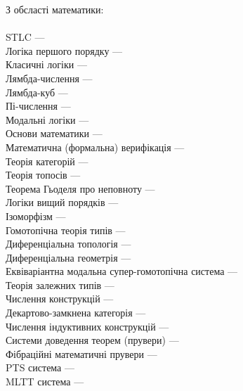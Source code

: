 \newpage
З обсласті математики:
\\
\\
STLC --- \\
Логіка першого порядку --- \\
Класичні логіки --- \\
Лямбда-числення --- \\
Лямбда-куб --- \\
Пі-числення --- \\
Модальні логіки --- \\
Основи математики --- \\
Математична (формальна) верифікація --- \\
Теорія категорій --- \\
Теорія топосів --- \\
Теорема Гьоделя про неповноту --- \\
Логіки вищий порядків --- \\
Ізоморфізм --- \\
Гомотопічна теорія типів --- \\
Диференціальна топологія --- \\
Диференціальна геометрія --- \\
Еквіваріантна модальна супер-гомотопічна система --- \\
Теорія залежних типів --- \\
Числення конструкцій --- \\
Декартово-замкнена категорія --- \\
Числення індуктивних конструкцій --- \\
Системи доведення теорем (прувери) --- \\
Фібраційні математичні прувери --- \\
PTS система --- \\
MLTT система --- \\
